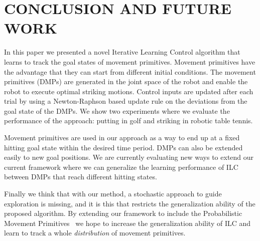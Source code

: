 \section{CONCLUSION AND FUTURE WORK}\label{conclusion}

In this paper we presented a novel Iterative Learning Control algorithm that learns to track the goal states of movement primitives. Movement primitives have the advantage that they can start from different initial conditions. The movement primitives (DMPs) are generated in the joint space of the robot and enable the robot to execute optimal striking motions. Control inputs are updated after each trial by using a Newton-Raphson based update rule on the deviations from the goal state of the DMPs.  We show two experiments where we evaluate the performance of the approach: putting in golf and striking in robotic table tennis. 

Movement primitives are used in our approach as a way to end up at a fixed hitting goal state within the desired time period. DMPs can also be extended easily to new goal positions. We are currently evaluating new ways to extend our current framework where we can generalize the learning performance of ILC between DMPs that reach different hitting states.

Finally we think that with our method, a stochastic approach to guide exploration is missing, and it is this that restricts the generalization ability of the proposed algorithm. By extending our framework to include the Probabilistic Movement Primitives~\cite{Paraschos13} we hope to increase the generalization ability of ILC and learn to track a whole \emph{distribution} of movement primitives.

%
%
%
